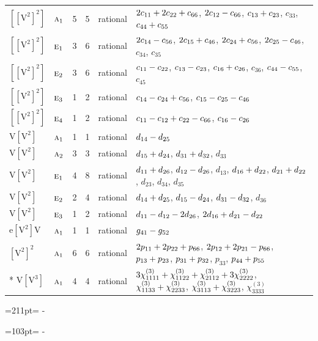 \documentclass[10pt,a4paper]{article}
\newcommand{\needspace}[1]{\par\penalty-100\begingroup\dimen0=#1\relax\dimen2=\pagegoal
  \advance\dimen2-\pagetotal\ifdim\dimen0>\dimen2\relax\ifdim\dimen2>0pt\vfil\break\fi\fi
  \endgroup}
\numberwithin{equation}{section}
\newcommand{\irr}[1]{\text{\normalfont\scshape #1}}
\newcommand{\jahn}[1]{\mathrm{#1}}
\newlength{\fillwidth}\newlength{\cellwidth}\newlength{\colwidth}
\newcommand{\signbreak}{\penalty100\relax}
\begin{document}
{\begin{longtable}{@{}llrrl>{\RaggedRight\arraybackslash}p{\fillwidth}@{}}
$\jahn{[[V^{2}]^{2}]}$ & $\irr{a}_{1}$ & 5 & 5 & rational & $2c_{11} +\signbreak 2c_{22} +\signbreak c_{66}$, $2c_{12} -\signbreak c_{66}$, $c_{13} +\signbreak c_{23}$, $c_{33}$, $c_{44} +\signbreak c_{55}$\\
$\jahn{[[V^{2}]^{2}]}$ & $\irr{e}_{1}$ & 3 & 6 & rational & $2c_{14} -\signbreak c_{56}$, $2c_{15} +\signbreak c_{46}$, $2c_{24} +\signbreak c_{56}$, $2c_{25} -\signbreak c_{46}$, $c_{34}$, $c_{35}$\\
$\jahn{[[V^{2}]^{2}]}$ & $\irr{e}_{2}$ & 3 & 6 & rational & $c_{11} -\signbreak c_{22}$, $c_{13} -\signbreak c_{23}$, $c_{16} +\signbreak c_{26}$, $c_{36}$, $c_{44} -\signbreak c_{55}$, $c_{45}$\\
$\jahn{[[V^{2}]^{2}]}$ & $\irr{e}_{3}$ & 1 & 2 & rational & $c_{14} -\signbreak c_{24} +\signbreak c_{56}$, $c_{15} -\signbreak c_{25} -\signbreak c_{46}$\\
$\jahn{[[V^{2}]^{2}]}$ & $\irr{e}_{4}$ & 1 & 2 & rational & $c_{11} -\signbreak c_{12} +\signbreak c_{22} -\signbreak c_{66}$, $c_{16} -\signbreak c_{26}$\\
$\jahn{V[V^{2}]}$ & $\irr{a}_{1}$ & 1 & 1 & rational & $d_{14} -\signbreak d_{25}$\\
$\jahn{V[V^{2}]}$ & $\irr{a}_{2}$ & 3 & 3 & rational & $d_{15} +\signbreak d_{24}$, $d_{31} +\signbreak d_{32}$, $d_{33}$\\
$\jahn{V[V^{2}]}$ & $\irr{e}_{1}$ & 4 & 8 & rational & $d_{11} +\signbreak d_{26}$, $d_{12} -\signbreak d_{26}$, $d_{13}$, $d_{16} +\signbreak d_{22}$, $d_{21} +\signbreak d_{22}$, $d_{23}$, $d_{34}$, $d_{35}$\\
$\jahn{V[V^{2}]}$ & $\irr{e}_{2}$ & 2 & 4 & rational & $d_{14} +\signbreak d_{25}$, $d_{15} -\signbreak d_{24}$, $d_{31} -\signbreak d_{32}$, $d_{36}$\\
$\jahn{V[V^{2}]}$ & $\irr{e}_{3}$ & 1 & 2 & rational & $d_{11} -\signbreak d_{12} -\signbreak 2d_{26}$, $2d_{16} +\signbreak d_{21} -\signbreak d_{22}$\\
$\jahn{e[V^{2}]V}$ & $\irr{a}_{1}$ & 1 & 1 & rational & $\mathnormal{g}_{41} -\signbreak \mathnormal{g}_{52}$\\
$\jahn{[V^{2}]^{2}}$ & $\irr{a}_{1}$ & 6 & 6 & rational & $2p_{11} +\signbreak 2p_{22} +\signbreak p_{66}$, $2p_{12} +\signbreak 2p_{21} -\signbreak p_{66}$, $p_{13} +\signbreak p_{23}$, $p_{31} +\signbreak p_{32}$, $p_{33}$, $p_{44} +\signbreak p_{55}$\\*
$\jahn{V[V^{3}]}$ & $\irr{a}_{1}$ & 4 & 4 & rational & $3\chi^{(3)}_{1111} +\signbreak \chi^{(3)}_{1122} +\signbreak \chi^{(3)}_{2112} +\signbreak 3\chi^{(3)}_{2222}$, $\chi^{(3)}_{1133} +\signbreak \chi^{(3)}_{2233}$, $\chi^{(3)}_{3113} +\signbreak \chi^{(3)}_{3223}$, $\chi^{(3)}_{3333}$\\
\bottomrule\end{longtable}}
\needspace{211pt}
\needspace{103pt}
\end{document}
